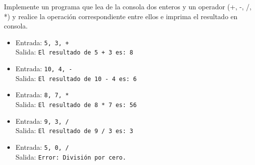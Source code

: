 Implemente un programa que lea de la consola dos enteros y un operador (+, -, /, *) y realice la operación correspondiente entre ellos e imprima el resultado en consola.
\begin{itemize}
    \item Entrada: \texttt{5, 3, +}\\
    Salida: \texttt{El resultado de 5 + 3 es: 8}
    
    \item Entrada: \texttt{10, 4, -}\\
    Salida: \texttt{El resultado de 10 - 4 es: 6}
    
    \item Entrada: \texttt{8, 7, *}\\
    Salida: \texttt{El resultado de 8 * 7 es: 56}
    
    \item Entrada: \texttt{9, 3, /}\\
    Salida: \texttt{El resultado de 9 / 3 es: 3}
    
    \item Entrada: \texttt{5, 0, /}\\
    Salida: \texttt{Error: División por cero.}
\end{itemize}
